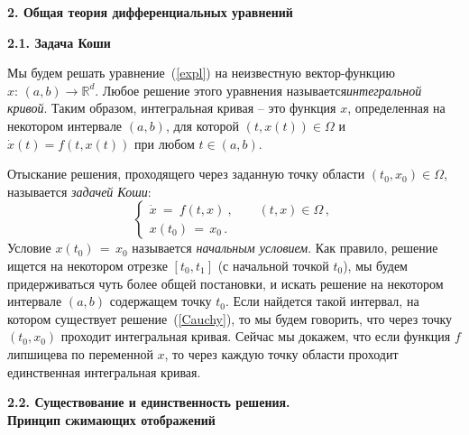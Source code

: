 \documentclass[12pt,a4paper]{article}
\newcommand{\re}{{\mathbb R}}
\begin{document}
\newpage  

\begin{center}
\large{\textbf{2. Общая теория дифференциальных уравнений}}
\end{center}

\bigskip


\begin{center}
\textbf{2.1. Задача Коши}
\end{center}
\medskip

Мы будем решать уравнение~(\ref{expl}) на неизвестную вектор-функцию $x: \, (a, b) \to \re^d$.
Любое решение этого уравнения называется{\em интегральной кривой}. Таким образом, интегральная кривая --
это функция $x$, определенная на некотором интервале $(a, b)$, для которой $(t, x(t)) \in \Omega$ и
$\dot x (t) = f(t, x(t))$ при любом $t \in (a, b)$.


Отыскание решения, проходящего через заданную точку области $(t_0, x_0)\in \Omega $, называется
{\em задачей Коши}:
\begin{equation}\label{Cauchy}\left\{
\begin{array}{l}
\dot x \ = \ f(t, x)\ , \qquad (t, x) \in \Omega\, ,\\
x(t_0)\, = \, x_0\, .
\end{array}
\right.
\end{equation}
Условие $x(t_0)\, = \, x_0$ называется {\em начальным условием}. Как правило,
решение ищется на некотором отрезке $[t_0, t_1]$ (с начальной точкой $t_0$), мы будем придерживаться чуть более общей постановки, и искать решение на некотором интервале $(a, b)$ содержащем точку $t_0$. Если найдется такой интервал, на  котором
существует решение~(\ref{Cauchy}), то мы будем говорить, что через точку $(t_0, x_0)$ проходит интегральная кривая.
Сейчас мы докажем, что если функция $f$ липшицева по переменной $x$, то через каждую точку области проходит единственная интегральная кривая.
\medskip

\begin{center}
\textbf{2.2. Существование и единственность решения. \\
Принцип сжимающих отображений}
\end{center}
\medskip
\end{document}
